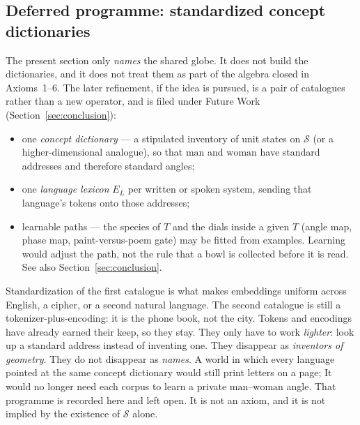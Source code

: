 \documentclass[12pt, a4paper]{article}
\begin{document}
\subsection{Deferred programme: standardized concept dictionaries}
\label{subsec:standard_dictionaries}
The present section only \emph{names} the shared globe. It does not
build the dictionaries, and it does not treat them as part of the
algebra closed in Axioms~1--6. The later refinement, if the idea is
pursued, is a pair of catalogues rather than a new operator, and is
filed under Future Work (Section~\ref{sec:conclusion}):
\begin{itemize}
    \item one \emph{concept dictionary} --- a stipulated inventory of
          unit states on $\mathcal{S}$ (or a higher-dimensional
          analogue), so that $\mathrm{man}$ and $\mathrm{woman}$ have
          standard addresses and therefore standard angles;
    \item one \emph{language lexicon} $E_L$ per written or spoken
          system, sending that language's tokens onto those addresses;
    \item learnable paths --- the species of $T$ and the dials inside
          a given $T$ (angle map, phase map, paint-versus-poem gate)
          may be fitted from examples. Learning would adjust the path,
          not the rule that a bowl is collected before it is read.
          See also Section~\ref{sec:conclusion}.
\end{itemize}
Standardization of the first catalogue is what makes embeddings
uniform across English, a cipher, or a second natural language.
The second catalogue is still a tokenizer-plus-encoding: it is the
phone book, not the city. Tokens and encodings have already earned
their keep, so they stay. They only have to work \emph{lighter}:
look up a standard address instead of inventing one. They disappear as
\emph{inventors of geometry}. They do not disappear as \emph{names}.
A world in which every language pointed at the same concept
dictionary would still print letters on a page; It would no longer need each 
corpus to learn a private $\mathrm{man}$--$\mathrm{woman}$ angle. 
That programme is recorded here and left open. It is not an
axiom, and it is not implied by the existence of $\mathcal{S}$ alone.
\end{document}
